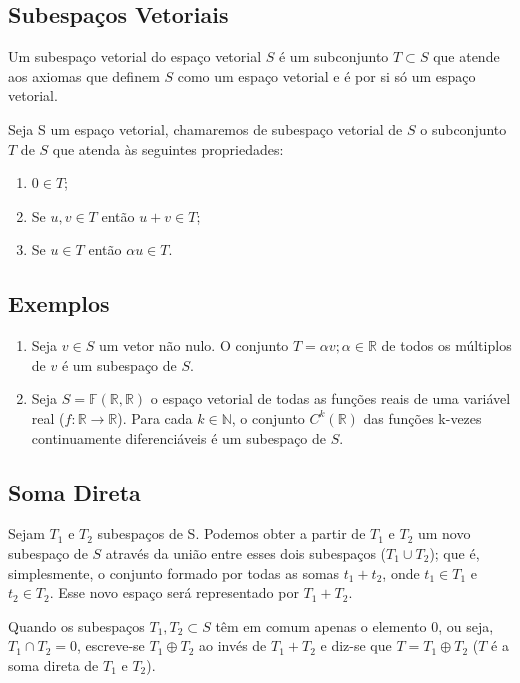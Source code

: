 \documentclass[a4paper,portuguese,9pt]{extarticle}
\begin{document}
\begin{multicols*}{2}
\section{Subespaços Vetoriais}

Um subespaço vetorial do espaço vetorial $S$ é um subconjunto $T \subset S$ que atende aos axiomas que definem $S$ como um espaço vetorial e é por si só um espaço vetorial. 

Seja S um espaço vetorial, chamaremos de subespaço vetorial de $S$ o subconjunto $T$ de $S$ que atenda às seguintes propriedades:

\begin{enumerate}[label=(\roman*)]
    \item $0 \in T$;
    \item Se $u, v \in T$ então $u+v \in T$;
    \item Se $u \in T$ então $\alpha u \in T$.
\end{enumerate}

\subsection{Exemplos}

\begin{enumerate}
    \item Seja $v \in S$ um vetor não nulo. O conjunto $T = {\alpha v; \alpha \in \mathbb{R} }$ de todos os múltiplos de $v$ é um subespaço de $S$.
    \item Seja $S = \mathbb{F}(\mathbb{R},\mathbb{R})$ o espaço vetorial de todas as funções reais de uma variável real ($f: \mathbb{R} \rightarrow \mathbb{R}$). Para cada $k \in \mathbb{N}$, o conjunto $C^k (\mathbb{R})$ das funções k-vezes continuamente diferenciáveis é um subespaço de $S$.
\end{enumerate}

\subsection{Soma Direta}

Sejam $T_1$ e $T_2$ subespaços de S. Podemos obter a partir de $T_1$ e $T_2$ um novo subespaço de $S$ através da união entre esses dois subespaços ($T_1 \cup T_2$); que é, simplesmente, o conjunto formado por todas as somas $t_1 + t_2$, onde $t_1 \in T_1$ e $t_2 \in T_2$. Esse novo espaço será representado por $T_1 + T_2$.

Quando os subespaços $T_1, T_2 \subset S$ têm em comum apenas o elemento ${0}$, ou seja, $T_1 \cap T_2 = {0}$, escreve-se $T_1 \oplus T_2$ ao invés de $T_1 + T_2$ e diz-se que $T = T_1 \oplus T_2$ ($T$ é a soma direta de $T_1$ e $T_2$).


\end{multicols*}
\end{document}
